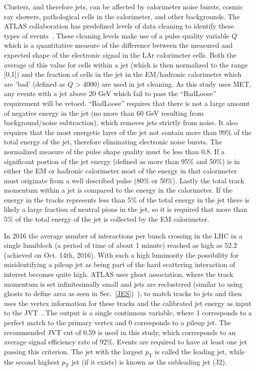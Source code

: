 Clusters, and therefore jets, can be affected by calorimeter noise bursts, cosmic ray showers, pathological cells in the calorimeter, and other backgrounds.  
The ATLAS collaboration has predefined levels of data cleaning to identify these types of events~\cite{ATLAS-CONF-2015-029}.  
These cleaning levels make use of a pulse quality variable $Q$ which is a quantitative measure of the difference between the measured and expected shape of the electronic signal in the LAr calorimeter cells.  
Both the average of this value for cells within a jet (which is then normalized to the range [0,1]) and the fraction of cells in the jet in the EM/hadronic calorimeter which are 'bad' (defined as $Q$ > 4000) are used in jet cleaning.  
As this study uses MET, any events with a jet above 20 GeV which fail to pass the ``BadLoose'' requirement will be vetoed.  
``BadLoose'' requires that there is not a large amount of negative energy in the jet (no more than 60 GeV resulting from background/noise subtraction), which removes jets strictly from noise.   
It also requires that the most energetic layer of the jet not contain more than 99\% of the total energy of the jet, therefore eliminating electronic noise bursts.   
The normalized measure of the pulse shape quality must be less than 0.8.  
If a significant portion of the jet energy (defined as more than 95\% and 50\%) is in either the EM or hadronic calorimeter most of the energy in that calorimeter must originate from a well described pulse (80\% or 50\%).  
Lastly the total track momentum within a jet is compared to the energy in the calorimeter.  
If the energy in the tracks represents less than 5\% of the total energy in the jet there is likely a large fraction of neutral pions in the jet, so it is required that more than 5\% of the total energy of the jet is collected by the EM calorimeter.  

In 2016 the average number of interactions per bunch crossing in the LHC in a single lumiblock (a period of time of about 1 minute) reached as high as 52.2 (achieved on Oct. 14th, 2016).  
With such a high luminosity the possibility for misidentifying a pileup jet as being part of the hard scattering interaction of interest becomes quite high.  
ATLAS uses ghost association, where the track momentum is set infinitesimally small and jets are reclustered (similar to using ghosts to define area as seen in Sec.~\ref{JES})~\cite{ATLAS-CONF-2013-083}), to match tracks to jets and then uses the vertex information for these tracks and the calibrated jet energy as input to the \gls{JVT}~\cite{ATLAS-CONF-2014-018}.  
The output is a single continuous variable, where 1 corresponds to a perfect match to the primary vertex and 0 corresponds to a pileup jet.  
The recommended JVT cut of 0.59 is used in this study, which corresponds to an average signal efficiency rate of 92\%.  
Events are required to have at least one jet passing this criterion.  
The jet with the largest $p_{\mathrm T}$ is called the leading jet, while the second highest $p_{\mathrm T}$ jet (if it exists) is known as the subleading jet (J2).  

